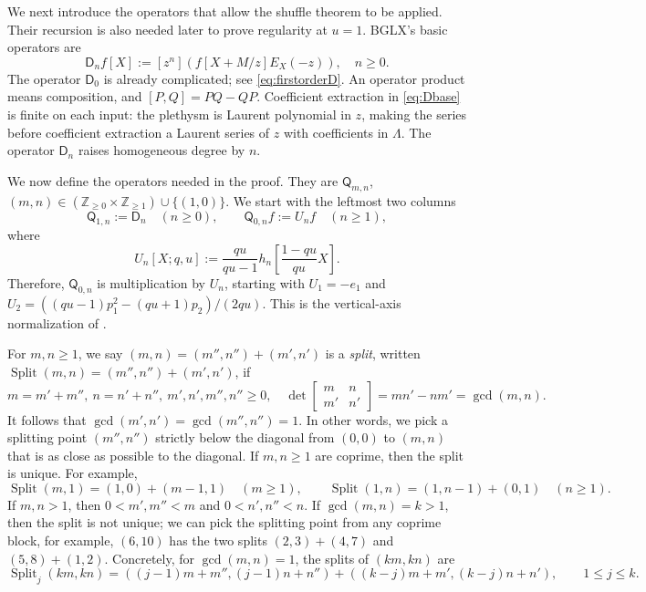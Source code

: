 \documentclass[12pt,reqno]{amsart}
\numberwithin{equation}{section}
\theoremstyle{definition}
\theoremstyle{remark}
\theoremstyle{plain}
\newcommand{\NN}{\mathbb Z_{\ge0}}
\newcommand{\ZZ}{\mathbb Z}
\newcommand{\Qop}{\mathsf Q}
\newcommand{\Dop}{\mathsf D}
\begin{document}
We next introduce the operators that allow the shuffle theorem to be applied. Their recursion is also needed later to prove regularity at $u=1$. BGLX's basic operators are
\begin{equation}\label{eq:Dbase}
 \Dop_n f[X]:=[z^n]\left(f[X+M/z]E_X(-z)\right), \quad n\geq 0.
\end{equation}
The operator $\Dop_0$ is already complicated; see \eqref{eq:firstorderD}. An operator product means composition, and $[P,Q]=PQ-QP$. Coefficient extraction in \eqref{eq:Dbase} is finite on each input: the plethysm is Laurent polynomial in $z$, making the series before coefficient extraction a Laurent series of $z$ with coefficients in $\Lambda$. The operator $\Dop_n$ raises homogeneous degree by $n$. 


We now define the operators needed in the proof. They are $\Qop_{m,n}$, $(m,n)\in (\NN\times \ZZ_{\ge 1})\cup \{(1,0)\}$. We start with the leftmost two columns
\[
 \Qop_{1,n}:=\Dop_n\quad(n\ge0),\qquad
 \Qop_{0,n}f:=U_n f\quad(n\ge1),
\]
where
\begin{equation}\label{eq:Uk}
 U_n[X;q,u]:=\frac{qu}{qu-1}
        h_n\left[\frac{1-qu}{qu}X\right].
\end{equation}
Therefore, $\Qop_{0,n}$ is multiplication by $U_n$, starting with $U_1=-e_1$ and $U_2=((qu-1)p_1^2-(qu+1)p_2)/(2qu)$. This is the vertical-axis
normalization of \cite[Algorithm~3.1 and Remark~5.1]{BGLX}.

For $m,n\geq 1$, we say $(m,n)=(m'',n'')+(m',n')$ is a \emph{split}, written $\operatorname{Split}(m,n)=(m'',n'')+(m',n')$, if
\[ m=m'+m'',\ n=n'+n'',\ m',n',m'',n''\ge 0, \quad \det\begin{bmatrix} m & n \\ m' & n'\end{bmatrix}=mn'-nm'=\gcd(m,n).\]
It follows that $\gcd(m',n')=\gcd(m'',n'')=1$. In other words, we pick a splitting point $(m'',n'')$ strictly below the diagonal from $(0,0)$ to $(m,n)$ that is as close as possible to the diagonal. 
If $m,n\ge 1$ are coprime, then the split is unique. For example,
\[
 \operatorname{Split}(m,1)=(1,0)+(m-1,1)\quad(m\ge 1), \qquad \operatorname{Split}(1,n)=(1,n-1)+(0,1)\quad(n\ge 1).
\]
If $m,n>1$, then $0<m',m''<m$ and $0<n',n''<n$. If $\gcd(m,n)=k>1$, then the split is not unique; we can pick the splitting point from any coprime block, for example, $(6,10)$ has the two splits $(2,3)+(4,7)$ and $(5,8)+(1,2)$. Concretely, for $\gcd(m,n)=1$, the splits of $(km,kn)$ are
\[ \operatorname{Split}_j(km,kn)=((j-1)m+m'',(j-1)n+n'')+((k-j)m+m',(k-j)n+n'), \qquad 1\le j\le k.\]
\end{document}
